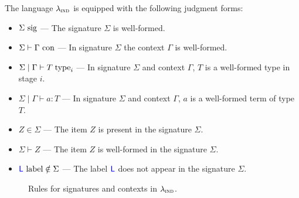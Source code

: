 The language $\lambdaind$ is equipped with the following judgment forms:
\begin{itemize}
  \item $\isSig{\Sigma}$ --- The signature $\Sigma$ is well-formed.
  \item $\Sigma \vdash \isCon{\Gamma}$ --- In signature $\Sigma$ the context $\Gamma$ is well-formed.
  \item $\Sigma \mid \Gamma \vdash \istype{i}{T}$ --- In signature $\Sigma$ and
        context $\Gamma$, $T$ is a well-formed type in stage $i$.
  \item $\Sigma \mid \Gamma \vdash a : T$ --- In signature $\Sigma$ and context
        $\Gamma$, $a$ is a well-formed term of type $T$.
  \item $Z \in \Sigma$ --- The item $Z$ is present in the signature $\Sigma$.
  \item $\Sigma \vdash Z$ --- The item $Z$ is well-formed in the signature $\Sigma$.
  \item $\isLabNotIn{L}{\Sigma}$ --- The label $\lab{L}$ does not appear in the
        signature $\Sigma$.
\end{itemize}

\begin{figure}[h]
  \caption{Rules for signatures and contexts in $\lambdaind$.}
  \label{fig:lambdaind-sig-rules}
\end{figure}

